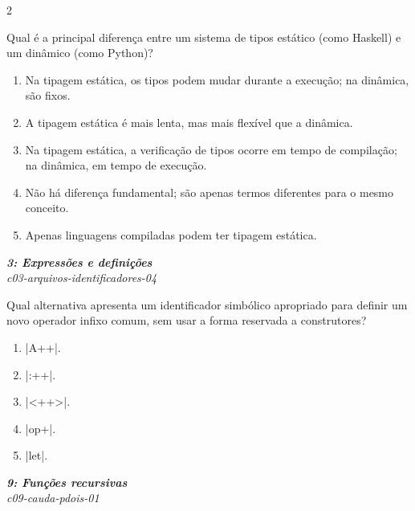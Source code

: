 \documentclass[a4paper,10pt,brazil]{article}
\begin{document}
\begin{multicols}{2}
\begin{flushright}
\end{flushright}
Qual é a principal diferença entre um sistema de tipos estático (como Haskell) e um dinâmico (como Python)?

\begin{enumerate}
  \item Na tipagem estática, os tipos podem mudar durante a execução; na dinâmica, são fixos.

  \item A tipagem estática é mais lenta, mas mais flexível que a dinâmica.

  \item Na tipagem estática, a verificação de tipos ocorre em tempo de compilação; na dinâmica, em tempo de execução.

  \item Não há diferença fundamental; são apenas termos diferentes para o mesmo conceito.

  \item Apenas linguagens compiladas podem ter tipagem estática.


\end{enumerate}

\begin{flushright}
  \footnotesize
  \textit{\textbf{3: Expressões e definições}}\\
  \textit{c03-arquivos-identificadores-04}\\

\end{flushright}
Qual alternativa apresenta um identificador simbólico apropriado para definir um novo operador infixo comum, sem usar a forma reservada a construtores?

\begin{enumerate}
  \item \haskellinline|A++|.

  \item \haskellinline|:++|.

  \item \haskellinline|<++>|.

  \item \haskellinline|op+|.

  \item \haskellinline|let|.


\end{enumerate}

\begin{flushright}
  \footnotesize
  \textit{\textbf{9: Funções recursivas}}\\
  \textit{c09-cauda-pdois-01}\\


\end{flushright}
\end{multicols}
\end{document}
